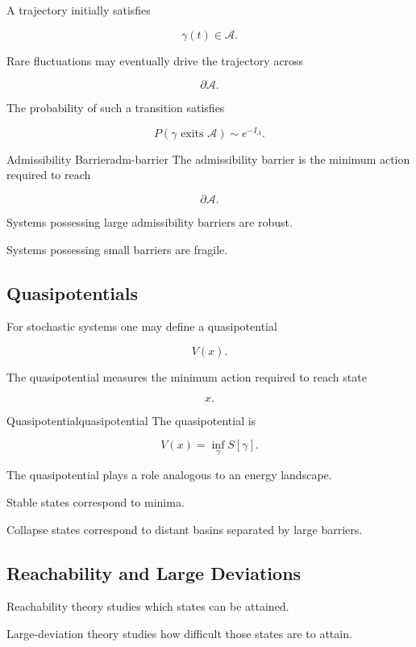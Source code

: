 \documentclass[12pt,twoside,openright]{book}
\begin{document}
A trajectory initially satisfies

\[
\gamma(t)
\in
\mathcal A.
\]

Rare fluctuations may eventually drive the trajectory
across

\[
\partial\mathcal A.
\]

The probability of such a transition satisfies

\[
P
\left(
\gamma
\text{ exits }
\mathcal A
\right)
\sim
e^{-I_A}.
\]

\begin{definition}{Admissibility Barrier}{adm-barrier}
The admissibility barrier is the minimum action required
to reach

\[
\partial\mathcal A.
\]
\end{definition}

Systems possessing large admissibility barriers are
robust.

Systems possessing small barriers are fragile.

\subsection{Quasipotentials}

For stochastic systems one may define a quasipotential

\[
V(x).
\]

The quasipotential measures the minimum action required to
reach state

\[
x.
\]

\begin{definition}{Quasipotential}{quasipotential}
The quasipotential is

\[
V(x)
=
\inf_{\gamma}
S[\gamma].
\]
\end{definition}

The quasipotential plays a role analogous to an energy
landscape.

Stable states correspond to minima.

Collapse states correspond to distant basins separated by
large barriers.

\subsection{Reachability and Large Deviations}

Reachability theory studies which states can be attained.

Large-deviation theory studies how difficult those states
are to attain.
\end{document}
